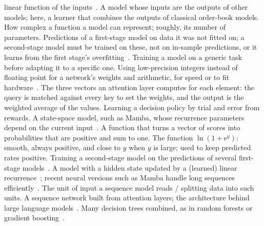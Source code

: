\begin{description}[leftmargin=1.2em,style=sameline,itemsep=1pt,font=\normalfont\bfseries]
  linear function of the inputs~\citep{hastie2009}.
 A model whose inputs are the outputs of other models; here, a learner that combines the outputs of classical order-book models.
 How complex a function a model can represent; roughly, its number of
  parameters.
 Predictions of a first-stage model on data it was not fitted on; a second-stage model must be trained on these, not on in-sample predictions, or it learns from the first stage's overfitting~\citep{breiman1996stack}.
 Training a model on a generic task before adapting it to a specific one.
 Using low-precision integers instead of floating point for a network's weights
  and arithmetic, for speed or to fit hardware~\citep{jacob2018}.
 The three vectors an attention layer computes for each element: the query is
  matched against every key to set the weights, and the output is the weighted average of the values.
 Learning a decision policy by trial and error from rewards.
 A state-space model, such as Mamba, whose recurrence parameters depend on the current input~\citep{gu2024mamba}.
 A function that turns a vector of scores into probabilities that are positive and sum to one.
 The function $\ln(1+\mathrm{e}^{y})$: smooth, always positive, and close to $y$ when $y$ is large; used to keep predicted rates positive.
 Training a second-stage model on the predictions of several first-stage models~\citep{wolpert1992,breiman1996stack}.
 A model with a hidden state updated by a (learned) linear
  recurrence~\citep{kalman1960}; recent neural versions such as Mamba handle long sequences
  efficiently~\citep{gu2024mamba}.
 The unit of input a sequence model reads / splitting data into such units.
 A sequence network built from attention layers; the architecture behind large
  language models~\citep{vaswani2017}.
 Many decision trees combined, as in random forests or gradient
  boosting~\citep{hastie2009}.
\end{description}

